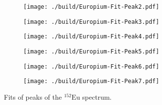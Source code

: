 \begin{figure}[H]
	\centering
	\begin{adjustbox}{width=1.3\textwidth, center}
		\begin{subfigure}{.5\textwidth}
			\centering
			\texttt{[image: ./build/Europium-Fit-Peak2.pdf]}
		\end{subfigure}%
		\begin{subfigure}{.5\textwidth}
			\centering
			\texttt{[image: ./build/Europium-Fit-Peak3.pdf]}
		\end{subfigure}
	\end{adjustbox}
	\begin{adjustbox}{width=1.3\textwidth, center}
		\begin{subfigure}{.5\textwidth}
			\centering
			\texttt{[image: ./build/Europium-Fit-Peak4.pdf]}
		\end{subfigure}%
		\begin{subfigure}{.5\textwidth}
			\centering
			\texttt{[image: ./build/Europium-Fit-Peak5.pdf]}
		\end{subfigure}
	\end{adjustbox}
	\begin{adjustbox}{width=1.3\textwidth, center}
		\begin{subfigure}{.5\textwidth}
			\centering
			\texttt{[image: ./build/Europium-Fit-Peak6.pdf]}
		\end{subfigure}%
		\begin{subfigure}{.5\textwidth}
			\centering
			\texttt{[image: ./build/Europium-Fit-Peak7.pdf]}
		\end{subfigure}
	\end{adjustbox}
	\caption{Fits of peaks of the $^{152}\text{Eu}$ spectrum.}
\end{figure}
